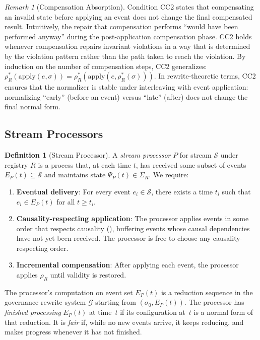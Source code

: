 \documentclass[11pt,a4paper]{article}
\theoremstyle{plain}
\theoremstyle{definition}
\newtheorem{definition}[theorem]{Definition}
\theoremstyle{remark}
\newtheorem{remark}[theorem]{Remark}
\renewcommand{\_}{\textunderscore\allowbreak}
\begin{document}
\begin{remark}[Compensation Absorption]
\label{rem:absorption}
Condition CC2 states that compensating an invalid state before applying an
event does not change the final compensated result.  Intuitively, the
repair that compensation performs ``would have been performed anyway'' during
the post-application compensation phase.  CC2 holds whenever compensation
repairs invariant violations in a way that is determined by the violation
pattern rather than the path taken to reach the violation.  By induction on
the number of compensation steps, CC2 generalizes:
$\rho_R^*(\mathrm{apply}(e, \sigma)) =
\rho_R^*(\mathrm{apply}(e, \rho_R^*(\sigma)))$.
In rewrite-theoretic terms, CC2 ensures that the normalizer is stable under
interleaving with event application: normalizing ``early'' (before an event)
versus ``late'' (after) does not change the final normal form.
\end{remark}

\subsection{Stream Processors}

\begin{definition}[Stream Processor]
\label{def:processor}
A \emph{stream processor} $P$ for stream $\mathcal{S}$ under registry $R$ is a
process that, at each time $t$, has received some subset of events
$E_P(t) \subseteq \mathcal{S}$ and maintains state $\Psi_P(t) \in \Sigma_R$.
We require:
\begin{enumerate}[leftmargin=*,nosep]
\item \textbf{Eventual delivery}: For every event $e_i \in \mathcal{S}$, there
  exists a time $t_i$ such that $e_i \in E_P(t)$ for all $t \geq t_i$.
\item \textbf{Causality-respecting application}: The processor applies events
  in some order that respects causality (), buffering
  events whose causal dependencies have not yet been received.  The processor
  is free to choose any causality-respecting order.
\item \textbf{Incremental compensation}: After applying each event, the
  processor applies $\rho_R$ until validity is restored.
\end{enumerate}
The processor's computation on event set $E_P(t)$ is a reduction sequence in
the governance rewrite system $\mathcal{G}$ starting from
$(\sigma_0, E_P(t))$.  The processor has \emph{finished processing} $E_P(t)$
at time~$t$ if its configuration at~$t$ is a normal form of that reduction.
It is \emph{fair} if, while no new events arrive, it keeps reducing, and makes
progress whenever it has not finished.
\end{definition}
\end{document}
